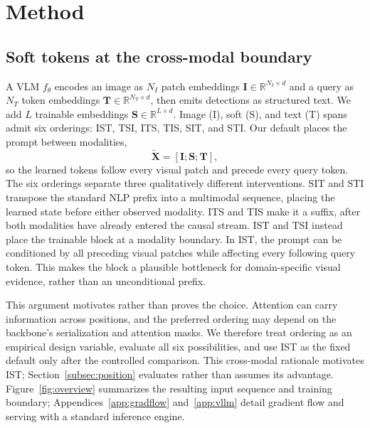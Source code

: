 \documentclass{article}
\begin{document}
\section{Method}
\label{sec:method}

\subsection{Soft tokens at the cross-modal boundary}
\label{subsec:method_position}

A VLM $f_\theta$ encodes an image as $N_I$ patch embeddings
$\mathbf{I}\in\mathbb{R}^{N_I\times d}$ and a query as $N_T$ token embeddings
$\mathbf{T}\in\mathbb{R}^{N_T\times d}$, then emits detections as structured
text.
We add $L$ trainable embeddings
$\mathbf{S}\in\mathbb{R}^{L\times d}$.
Image (I), soft (S), and text (T) spans admit six orderings: IST, TSI, ITS,
TIS, SIT, and STI.
Our default places the prompt between modalities,
\begin{equation}
  \widetilde{\mathbf{X}}=[\mathbf{I};\mathbf{S};\mathbf{T}],
  \label{eq:ist}
\end{equation}
so the learned tokens follow every visual patch and precede every query token.
The six orderings separate three qualitatively different interventions.
SIT and STI transpose the standard NLP prefix into a multimodal sequence,
placing the learned state before either observed modality. ITS and TIS make it
a suffix, after both modalities have already entered the causal stream. IST
and TSI instead place the trainable block at a modality boundary. In IST, the
prompt can be conditioned by all preceding visual patches while affecting
every following query token. This makes the block a plausible bottleneck for
domain-specific visual evidence, rather than an unconditional prefix.

This argument motivates rather than proves the choice. Attention can carry
information across positions, and the preferred ordering may depend on the
backbone's serialization and attention masks. We therefore treat ordering as
an empirical design variable, evaluate all six possibilities, and use IST as
the fixed default only after the controlled comparison.
This cross-modal rationale motivates IST; Section~\ref{subsec:position}
evaluates rather than assumes its advantage.
Figure~\ref{fig:overview} summarizes the resulting input sequence and training
boundary; Appendices~\ref{app:gradflow} and~\ref{app:vllm} detail gradient flow
and serving with a standard inference engine.
\end{document}
